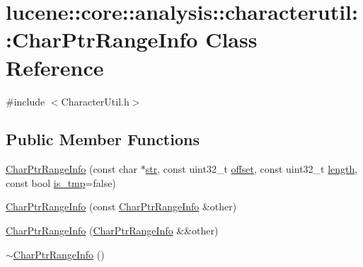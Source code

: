 \hypertarget{classlucene_1_1core_1_1analysis_1_1characterutil_1_1CharPtrRangeInfo}{}\section{lucene\+:\+:core\+:\+:analysis\+:\+:characterutil\+:\+:Char\+Ptr\+Range\+Info Class Reference}
\label{classlucene_1_1core_1_1analysis_1_1characterutil_1_1CharPtrRangeInfo}


{\ttfamily \#include $<$Character\+Util.\+h$>$}

\subsection*{Public Member Functions}
\begin{DoxyCompactItemize}
\item 
\mbox{\hyperlink{classlucene_1_1core_1_1analysis_1_1characterutil_1_1CharPtrRangeInfo_a226d1ddc2c1996f0cd4fc6f2127f8196}{Char\+Ptr\+Range\+Info}} (const char $\ast$\mbox{\hyperlink{classlucene_1_1core_1_1analysis_1_1characterutil_1_1CharPtrRangeInfo_a353ede88ef69e0a7c11523fd7d419ef6}{str}}, const uint32\+\_\+t \mbox{\hyperlink{classlucene_1_1core_1_1analysis_1_1characterutil_1_1CharPtrRangeInfo_a9ac49265cf8865e7a935631243c7e9bd}{offset}}, const uint32\+\_\+t \mbox{\hyperlink{classlucene_1_1core_1_1analysis_1_1characterutil_1_1CharPtrRangeInfo_a816e4469bb018338dacaf8444c279688}{length}}, const bool \mbox{\hyperlink{classlucene_1_1core_1_1analysis_1_1characterutil_1_1CharPtrRangeInfo_ab54d53df8367d85ed226d19c187d6e28}{is\+\_\+tmp}}=false)
\item 
\mbox{\hyperlink{classlucene_1_1core_1_1analysis_1_1characterutil_1_1CharPtrRangeInfo_a7a6bcc19c443e90c94bdc7314aaa528a}{Char\+Ptr\+Range\+Info}} (const \mbox{\hyperlink{classlucene_1_1core_1_1analysis_1_1characterutil_1_1CharPtrRangeInfo}{Char\+Ptr\+Range\+Info}} \&other)
\item 
\mbox{\hyperlink{classlucene_1_1core_1_1analysis_1_1characterutil_1_1CharPtrRangeInfo_aa0f50f7970050ddffb8fe3c043ec1c04}{Char\+Ptr\+Range\+Info}} (\mbox{\hyperlink{classlucene_1_1core_1_1analysis_1_1characterutil_1_1CharPtrRangeInfo}{Char\+Ptr\+Range\+Info}} \&\&other)
\item 
\mbox{\hyperlink{classlucene_1_1core_1_1analysis_1_1characterutil_1_1CharPtrRangeInfo_a44c560301551a00fb0a51d9a9edce477}{$\sim$\+Char\+Ptr\+Range\+Info}} ()
\end{DoxyCompactItemize}
